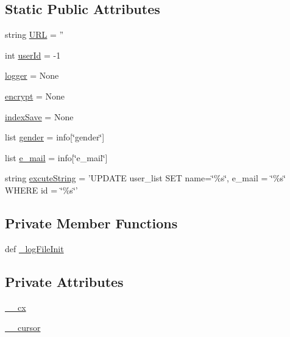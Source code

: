 \subsection*{Static Public Attributes}
\begin{DoxyCompactItemize}
\item 
string \hyperlink{classweb_1_1database_1_1_sqlite_database_aa62e00d2f526c1346d4391a4d649a19a}{U\-R\-L} = ''
\item 
int \hyperlink{classweb_1_1database_1_1_sqlite_database_af5d008512a8d152ad79c1b9cfc58097d}{user\-Id} = -\/1
\item 
\hyperlink{classweb_1_1database_1_1_sqlite_database_a1d968a28b9a00bfaaf4e5ac2e5f92690}{logger} = None
\item 
\hyperlink{classweb_1_1database_1_1_sqlite_database_a2b876b67d049ed3ef82feacbc243d3a7}{encrypt} = None
\item 
\hyperlink{classweb_1_1database_1_1_sqlite_database_a50b151e9a3e9cff8d36526b2bb89fa62}{index\-Save} = None
\item 
list \hyperlink{classweb_1_1database_1_1_sqlite_database_a0b783641b69364d5118705bf4b86c472}{gender} = info\mbox{[}\char`\"{}gender\char`\"{}\mbox{]}
\item 
list \hyperlink{classweb_1_1database_1_1_sqlite_database_a2a8703cf9c38155c5aa718bfb865d906}{e\-\_\-mail} = info\mbox{[}\char`\"{}e\-\_\-mail\char`\"{}\mbox{]}
\item 
string \hyperlink{classweb_1_1database_1_1_sqlite_database_aa8bf127420f658556995eb701e269d0a}{excute\-String} = 'U\-P\-D\-A\-T\-E user\-\_\-list S\-E\-T name=\char`\"{}\%s\char`\"{}, e\-\_\-mail = \char`\"{}\%s\char`\"{} W\-H\-E\-R\-E id = \char`\"{}\%s\char`\"{}'
\end{DoxyCompactItemize}
\subsection*{Private Member Functions}
\begin{DoxyCompactItemize}
\item 
def \hyperlink{classweb_1_1database_1_1_sqlite_database_a923595c385ef09ac5cc6168db7438b32}{\-\_\-log\-File\-Init}
\end{DoxyCompactItemize}
\subsection*{Private Attributes}
\begin{DoxyCompactItemize}
\item 
\hyperlink{classweb_1_1database_1_1_sqlite_database_a1c23227118cb4ad9d99c65d0976dd09c}{\-\_\-\-\_\-cx}
\item 
\hyperlink{classweb_1_1database_1_1_sqlite_database_a97f8e9690c07fab2746f838aabb67866}{\-\_\-\-\_\-cursor}
\end{DoxyCompactItemize}


